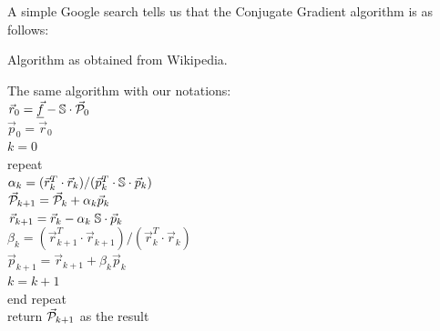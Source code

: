 A simple Google search tells us that the Conjugate Gradient algorithm is as follows:

\begin{minipage}{0.40\textwidth}
\centering
{\captionfont Algorithm as obtained from Wikipedia.}\\
\end{minipage}\hfill
\begin{minipage}{0.50\textwidth}
The same algorithm with our notations:\\
$\vec{r}_0 = \underline{\vec{f}} - {\mathbb{S}} \cdot \vec{\cal P}_0$\\
$\vec{p}_0 = \vec{r}_0$\\
$k=0$ \\
repeat\\
\hspace{8mm} $\alpha_k = (\vec{r}_k^T\cdot \vec{r}_k )/(\vec{p}_k^T \cdot {\mathbb{S}}\cdot  \vec{p}_k )$\\
\hspace{8mm} $\vec{\cal P}_{k+1} = \vec{\cal P}_k+\alpha_k \vec{p}_k$\\
\hspace{8mm} $\vec{r}_{k+1} = \vec{r}_k - \alpha_k \; {\mathbb{S}} \cdot \vec{p}_k $ \\
\hspace{8mm} $\beta_k=(\vec{r}_{k+1}^T \cdot \vec{r}_{k+1})/(\vec{r}_k^T \cdot \vec{r}_k)$ \\
\hspace{8mm} $\vec{p}_{k+1} =\vec{r}_{k+1}+ \beta_k \vec{p}_k$ \\
$k=k+1$ \\
end repeat\\
return $\vec{\cal P}_{k+1}$ as the result
\end{minipage}

\vspace{.5cm}

